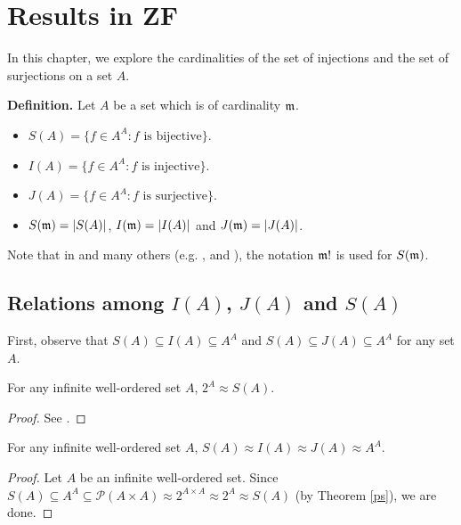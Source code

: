 \chapter{Results in ZF}

In this chapter, we explore the cardinalities of the set of injections and the set of surjections on a set $A$.

\noindent\textbf{Definition.} Let $A$ be a set which is of cardinality $\frak{m}$.
    \begin{itemize}\itemsep0em
     \item $S(A) = \{f\in A^{A}:f\text{ is bijective}\}.$
        \item $I(A)=\{f\in A^{A}:f\text{ is injective}\}.$
        \item $J(A)=\{f\in A^{A}:f\text{ is surjective}\}.$
        \item $S(\frak{m})=|S(A)|$, $I(\frak{m})=|I(A)|$ and $J(\frak{m})=|J(A)|$.  
    \end{itemize}
 \noindent Note that in \cite{DH} and many others (e.g. \cite{ShenYuan}, \cite{SonVej18} and \cite{SonVej2019}), the notation $\frak{m}!$ is used for $S(\frak{m})$.   
 



\section{Relations among $I(A)$, $J(A)$ and $S(A)$}

First, observe that $S(A) \subseteq I(A) \subseteq A^A$ and $S(A) \subseteq J(A) \subseteq A^A$ for any set $A$. 

\begin{theorem}\label{ps}
    For any infinite well-ordered set $A$, $2^{A}\approx S(A)$.
\end{theorem}

\begin{proof}
See \cite[Theorem 1.2]{DH}.    
\end{proof}

\begin{theorem}
   For any infinite well-ordered set $A$, $S(A) \approx I(A) \approx J(A) \approx A^A$.
\end{theorem}

\begin{proof}
    Let $A$ be an infinite well-ordered set. Since $S(A)\subseteq A^{A}\subseteq\mathcal{P}(A\times A)\approx 2^{A\times A}\approx 2^{A}\approx S(A)$ (by Theorem \ref{ps}), we are done.
\end{proof}

